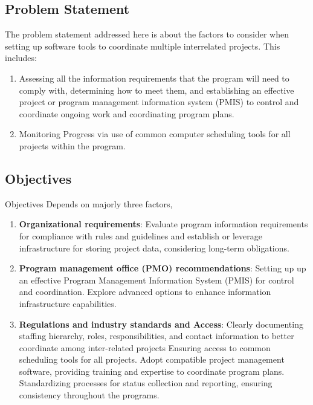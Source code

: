 \documentclass{llncs}
\begin{document}
\subsection{Problem Statement}

The problem statement addressed here is about the factors to consider when setting up software tools to coordinate multiple interrelated projects. This includes:
\begin{enumerate}
  \item Assessing all the information requirements that the program will need to comply with, determining how to meet them, and establishing an effective project or program management information system (PMIS) to control and coordinate ongoing work and coordinating program plans.

 \item Monitoring Progress via use of common computer scheduling tools for all projects within the program.

\end{enumerate}


\subsection{Objectives}
Objectives Depends on majorly three factors,
\begin{enumerate}

\item \textbf{Organizational requirements}:
\subitem Evaluate program information requirements for compliance with rules and guidelines and establish or leverage infrastructure for storing project data, considering long-term obligations.
\item \textbf{Program management office (PMO) recommendations}:
\subitem Setting up up an effective Program Management Information System (PMIS) for control and coordination.
\subitem Explore advanced options to enhance information infrastructure capabilities.
\item \textbf{Regulations and industry standards and Access}:
\subitem Clearly documenting staffing hierarchy, roles, responsibilities, and contact information to better coordinate among inter-related projects
\subitem Ensuring access to common scheduling tools for all projects.
\subitem Adopt compatible project management software, providing training and expertise to coordinate program plans.
\subitem Standardizing processes for status collection and reporting, ensuring consistency throughout the programs.

\end{enumerate}
\end{document}
